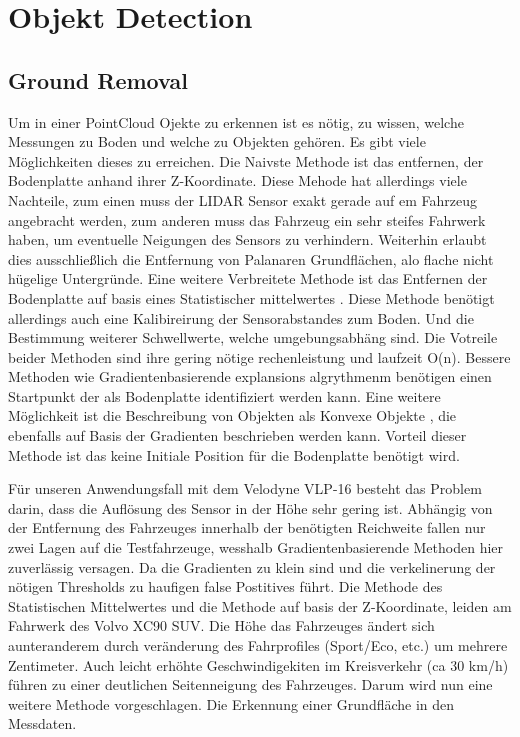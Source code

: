 \documentclass[11pt,oneside,openright]{mpreport}
\begin{document}
\section{Objekt Detection}

\subsection{Ground Removal}
Um in einer PointCloud Ojekte zu erkennen ist es nötig, zu wissen, welche Messungen zu Boden und welche zu Objekten gehören. Es gibt viele Möglichkeiten dieses
zu erreichen. Die Naivste Methode ist das entfernen, der Bodenplatte anhand ihrer Z-Koordinate. Diese Mehode hat allerdings viele Nachteile, zum einen muss
der LIDAR Sensor exakt gerade auf em Fahrzeug angebracht werden, zum anderen muss das Fahrzeug ein sehr steifes Fahrwerk haben, um eventuelle Neigungen des Sensors zu verhindern.
Weiterhin erlaubt dies ausschließlich die Entfernung von Palanaren Grundflächen, alo flache nicht hügelige Untergründe. Eine weitere Verbreitete Methode ist das 
Entfernen der Bodenplatte auf basis eines Statistischer mittelwertes \cite{Zhang}.  Diese Methode benötigt allerdings auch eine Kalibireirung der Sensorabstandes zum Boden.
Und die Bestimmung weiterer Schwellwerte, welche umgebungsabhäng sind. Die Votreile beider Methoden sind ihre gering nötige rechenleistung und laufzeit O(n).
Bessere Methoden wie Gradientenbasierende explansions algrythmenm benötigen einen Startpunkt der als Bodenplatte identifiziert werden kann.
Eine weitere Möglichkeit ist die Beschreibung von Objekten als Konvexe Objekte \cite{5164280}, die ebenfalls auf Basis der Gradienten beschrieben werden kann.
Vorteil dieser Methode ist das keine Initiale Position für die Bodenplatte benötigt wird.

Für unseren Anwendungsfall mit dem Velodyne VLP-16 besteht das Problem darin, dass die Auflösung des Sensor in der Höhe sehr gering ist. Abhängig von der Entfernung des 
Fahrzeuges innerhalb der benötigten Reichweite fallen nur zwei Lagen auf die Testfahrzeuge, wesshalb Gradientenbasierende Methoden hier zuverlässig versagen.  Da die Gradienten zu klein sind und
die verkelinerung der nötigen Thresholds zu haufigen false Postitives führt. Die Methode des Statistischen Mittelwertes und die Methode auf basis der Z-Koordinate,
leiden am Fahrwerk des Volvo XC90 SUV. Die Höhe das Fahrzeuges ändert sich aunteranderem durch veränderung des Fahrprofiles (Sport/Eco, etc.) um mehrere Zentimeter.
Auch leicht erhöhte Geschwindigekiten im Kreisverkehr (ca 30 km/h) führen zu einer deutlichen Seitenneigung des Fahrzeuges. Darum wird nun eine weitere Methode vorgeschlagen.
Die Erkennung einer Grundfläche in den Messdaten. 
\end{document}
